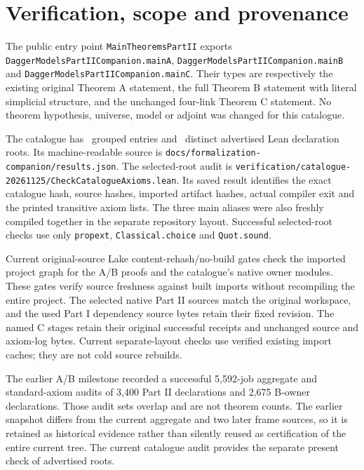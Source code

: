 \section{Verification, scope and provenance}

The public entry point \nolinkurl{MainTheoremsPartII} exports
\nolinkurl{DaggerModelsPartIICompanion.mainA},
\nolinkurl{DaggerModelsPartIICompanion.mainB} and
\nolinkurl{DaggerModelsPartIICompanion.mainC}.
Their types are respectively the existing original Theorem A statement,
the full Theorem B statement with literal simplicial structure,
and the unchanged four-link Theorem C statement.
No theorem hypothesis, universe, model or adjoint was changed for this catalogue.

The catalogue has \CatalogueCount\ grouped entries and
\CatalogueDeclarationCount\ distinct advertised Lean declaration roots.
Its machine-readable source is
\nolinkurl{docs/formalization-companion/results.json}.
The selected-root audit is
\nolinkurl{verification/catalogue-20261125/CheckCatalogueAxioms.lean}.
Its saved result identifies the exact catalogue hash, source hashes, imported
artifact hashes, actual compiler exit and the printed transitive axiom lists.
The three main aliases were also freshly compiled together in the separate
repository layout.
Successful selected-root checks use only
\texttt{propext}, \texttt{Classical.choice} and \texttt{Quot.sound}.

Current original-source Lake content-rehash/no-build gates check the imported
project graph for the A/B proofs and the catalogue's native owner modules.
These gates verify source freshness against built imports without recompiling
the entire project.
The selected native Part II sources match the original workspace, and the
used Part I dependency source bytes retain their fixed revision.
The named C stages retain their original successful receipts and unchanged
source and axiom-log bytes.
Current separate-layout checks use verified existing import caches;
they are not cold source rebuilds.

The earlier A/B milestone recorded a successful 5,592-job aggregate and
standard-axiom audits of 3,400 Part II declarations and 2,675 B-owner declarations.
Those audit sets overlap and are not theorem counts.
The earlier snapshot differs from the current aggregate and two later frame
sources, so it is retained as historical evidence rather than silently reused
as certification of the entire current tree.
The current catalogue audit provides the separate present check of advertised
roots.

